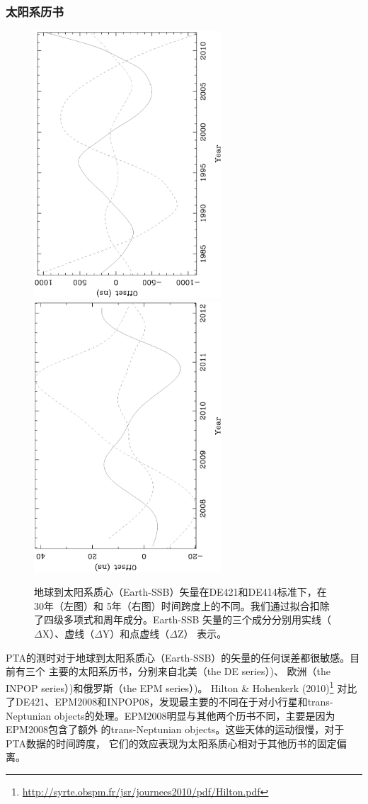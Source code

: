 \subsubsection{太阳系历书}
\begin{figure}
\includegraphics[angle=-90,width=7cm]{ephem1.ps}
\includegraphics[angle=-90,width=7cm]{ephem2.ps}
\caption{地球到太阳系质心（Earth-SSB）矢量在DE421和DE414标准下，在30年（左图）和
5年（右图）时间跨度上的不同。我们通过拟合扣除了四级多项式和周年成分。Earth-SSB
矢量的三个成分分别用实线（$\Delta$X）、虚线（$\Delta$Y）和点虚线（$\Delta$Z）
表示。} 
\label{fg:ephDiff}
\end{figure}

PTA的测时对于地球到太阳系质心（Earth-SSB）的矢量的任何误差都很敏感。目前有三个
主要的太阳系历书，分别来自北美（the DE series）\supercite{nsw83})、
欧洲（the INPOP series）\supercite{fmlg08})和俄罗斯（the EPM series）\supercite{pit05})。
Hilton \& Hohenkerk (2010)\footnote{\url{http://syrte.obspm.fr/jsr/journees2010/pdf/Hilton.pdf}}
对比了DE421、EPM2008和INPOP08，发现最主要的不同在于对小行星和trans-Neptunian 
objects的处理。EPM2008明显与其他两个历书不同，主要是因为EPM2008包含了额外
的trans-Neptunian objects。这些天体的运动很慢，对于PTA数据的时间跨度，
它们的效应表现为太阳系质心相对于其他历书的固定偏离。

